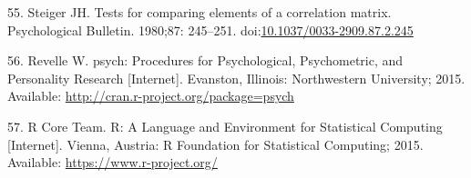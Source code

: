 \documentclass[]{article}
\begin{document}
\leavevmode\hypertarget{ref-Steiger1980}{}%
55. Steiger JH. Tests for comparing elements of a correlation matrix.
Psychological Bulletin. 1980;87: 245--251.
doi:\href{https://doi.org/10.1037/0033-2909.87.2.245}{10.1037/0033-2909.87.2.245}

\leavevmode\hypertarget{ref-Revelle2015}{}%
56. Revelle W. psych: Procedures for Psychological, Psychometric, and
Personality Research {[}Internet{]}. Evanston, Illinois: Northwestern
University; 2015. Available:
\url{http://cran.r-project.org/package=psych}

\leavevmode\hypertarget{ref-RCoreTeam2015}{}%
57. R Core Team. R: A Language and Environment for Statistical Computing
{[}Internet{]}. Vienna, Austria: R Foundation for Statistical Computing;
2015. Available: \url{https://www.r-project.org/}
\end{document}

